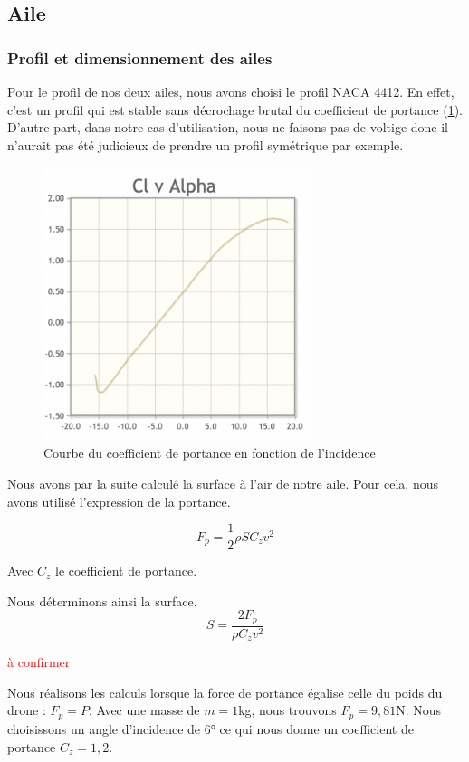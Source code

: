 \documentclass[a4paper,12pt,french]{report}
\begin{document}
\subsection{Aile}

\subsubsection*{Profil et dimensionnement des ailes}

Pour le profil de nos deux ailes, nous avons choisi le profil NACA 4412. En effet, c'est un profil qui est stable sans décrochage brutal du coefficient de portance (\ref{cz}). D'autre part, dans notre cas d'utilisation, nous ne faisons pas de voltige donc il n'aurait pas été judicieux de prendre un profil symétrique par exemple.

\begin{figure}[h]
    \centering
    \includegraphics[height=8cm]{figures/cz.png}
    \caption{Courbe du coefficient de portance en fonction de l'incidence}
    \label{cz}
\end{figure}

Nous avons par la suite calculé la surface à l'air de notre aile. Pour cela, nous avons utilisé l'expression de la portance.

$$ F_p=\frac{1}{2}\rho S C_z v^2$$

Avec $C_z$ le coefficient de portance.

Nous déterminons ainsi la surface.
$$S=\frac{2F_p}{\rho C_z v^2}$$

\textcolor{red}{à confirmer}

Nous réalisons les calculs lorsque la force de portance égalise celle du poids du drone : $F_p=P.$ Avec une masse de $m=1$kg, nous trouvons $F_p=9,81$N. Nous choisissons un angle d'incidence de $6°$ ce qui nous donne un coefficient de portance $C_z=1,2$.\newline
\end{document}
